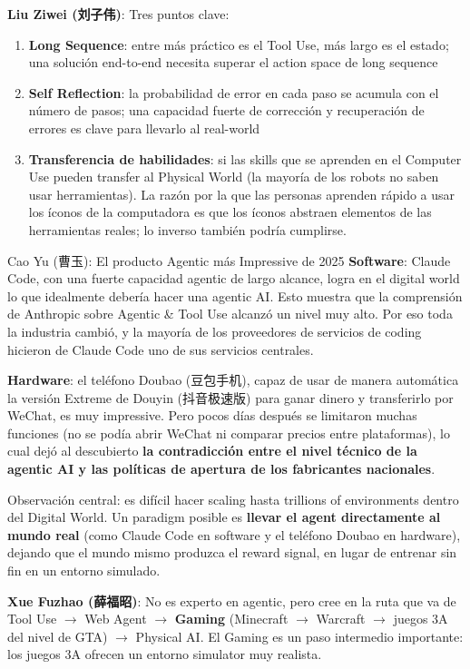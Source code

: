 \documentclass[a4paper]{article}
\begin{document}
\textbf{Liu Ziwei (刘子伟)}: Tres puntos clave:
\begin{enumerate}
  \item \textbf{Long Sequence}: entre más práctico es el Tool Use, más largo es el estado; una solución end-to-end necesita superar el action space de long sequence
  \item \textbf{Self Reflection}: la probabilidad de error en cada paso se acumula con el número de pasos; una capacidad fuerte de corrección y recuperación de errores es clave para llevarlo al real-world
  \item \textbf{Transferencia de habilidades}: si las skills que se aprenden en el Computer Use pueden transfer al Physical World (la mayoría de los robots no saben usar herramientas). La razón por la que las personas aprenden rápido a usar los íconos de la computadora es que los íconos abstraen elementos de las herramientas reales; lo inverso también podría cumplirse.
\end{enumerate}

\begin{importantbox}{Cao Yu (曹玉): El producto Agentic más Impressive de 2025}
\textbf{Software}: Claude Code, con una fuerte capacidad agentic de largo alcance, logra en el digital world lo que idealmente debería hacer una agentic AI. Esto muestra que la comprensión de Anthropic sobre Agentic \& Tool Use alcanzó un nivel muy alto. Por eso toda la industria cambió, y la mayoría de los proveedores de servicios de coding hicieron de Claude Code uno de sus servicios centrales.

\textbf{Hardware}: el teléfono Doubao (豆包手机), capaz de usar de manera automática la versión Extreme de Douyin (抖音极速版) para ganar dinero y transferirlo por WeChat, es muy impressive. Pero pocos días después se limitaron muchas funciones (no se podía abrir WeChat ni comparar precios entre plataformas), lo cual dejó al descubierto \textbf{la contradicción entre el nivel técnico de la agentic AI y las políticas de apertura de los fabricantes nacionales}.

Observación central: es difícil hacer scaling hasta trillions of environments dentro del Digital World. Un paradigm posible es \textbf{llevar el agent directamente al mundo real} (como Claude Code en software y el teléfono Doubao en hardware), dejando que el mundo mismo produzca el reward signal, en lugar de entrenar sin fin en un entorno simulado.
\end{importantbox}

\textbf{Xue Fuzhao (薛福昭)}: No es experto en agentic, pero cree en la ruta que va de Tool Use $\to$ Web Agent $\to$ \textbf{Gaming} (Minecraft $\to$ Warcraft $\to$ juegos 3A del nivel de GTA) $\to$ Physical AI. El Gaming es un paso intermedio importante: los juegos 3A ofrecen un entorno simulator muy realista.
\end{document}
